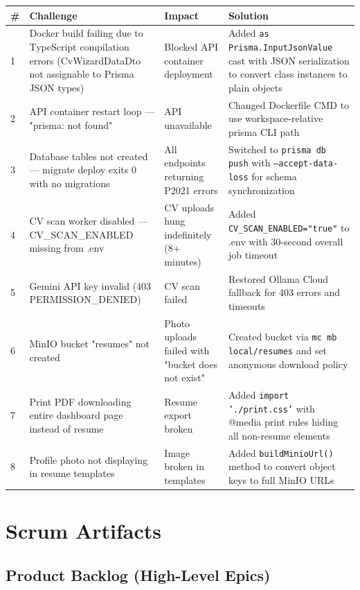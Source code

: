 \documentclass[12pt,a4paper]{report}
\begin{document}
\begin{longtable}{|p{0.5cm}|p{4.5cm}|p{4cm}|p{4cm}|}
\hline
\textbf{\#} & \textbf{Challenge} & \textbf{Impact} & \textbf{Solution} \\
\hline
1 & Docker build failing due to TypeScript compilation errors (CvWizardDataDto not assignable to Prisma JSON types) & Blocked API container deployment & Added \texttt{as Prisma.InputJsonValue} cast with JSON serialization to convert class instances to plain objects \\
\hline
2 & API container restart loop — "prisma: not found" & API unavailable & Changed Dockerfile CMD to use workspace-relative prisma CLI path \\
\hline
3 & Database tables not created — migrate deploy exits 0 with no migrations & All endpoints returning P2021 errors & Switched to \texttt{prisma db push} with \texttt{--accept-data-loss} for schema synchronization \\
\hline
4 & CV scan worker disabled — CV\_SCAN\_ENABLED missing from .env & CV uploads hung indefinitely (8+ minutes) & Added \texttt{CV\_SCAN\_ENABLED="true"} to .env with 30-second overall job timeout \\
\hline
5 & Gemini API key invalid (403 PERMISSION\_DENIED) & CV scan failed & Restored Ollama Cloud fallback for 403 errors and timeouts \\
\hline
6 & MinIO bucket "resumes" not created & Photo uploads failed with "bucket does not exist" & Created bucket via \texttt{mc mb local/resumes} and set anonymous download policy \\
\hline
7 & Print PDF downloading entire dashboard page instead of resume & Resume export broken & Added \texttt{import './print.css'} with @media print rules hiding all non-resume elements \\
\hline
8 & Profile photo not displaying in resume templates & Image broken in templates & Added \texttt{buildMinioUrl()} method to convert object keys to full MinIO URLs \\
\hline
\end{longtable}

\section{Scrum Artifacts}

\subsection{Product Backlog (High-Level Epics)}
\end{document}
